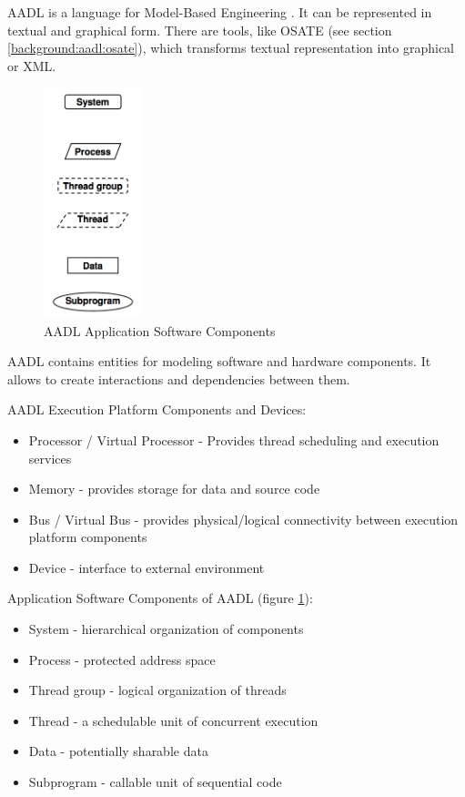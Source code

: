 AADL is a language for Model-Based Engineering \cite{AadlBook}. It can be represented in textual and graphical form. There are tools, like OSATE (see section \ref{background:aadl:osate}), which transforms textual representation into graphical or XML. 

\begin{figure}
  \begin{center}
    \includegraphics[width=0.25\textwidth]{figures/aadl-app-components.png}
  \end{center}
  \caption{AADL Application Software Components}
  \label{figure:aadl_app_software_components}
\end{figure}

AADL contains entities for modeling software and hardware components. It allows to create interactions and dependencies between them.

AADL Execution Platform Components and Devices:
\begin{itemize}
	\item Processor / Virtual Processor - Provides thread scheduling and execution services
	\item Memory - provides storage for data and source code
	\item Bus / Virtual Bus - provides physical/logical connectivity between execution platform components
	\item Device - interface to external environment
\end{itemize}

Application Software Components of AADL (figure \ref{figure:aadl_app_software_components}):
\begin{itemize}
	\item System - hierarchical organization of components
	\item Process - protected address space
	\item Thread group - logical organization of threads
	\item Thread - a schedulable unit of concurrent execution
	\item Data - potentially sharable data
	\item Subprogram - callable unit of sequential code
\end{itemize}

